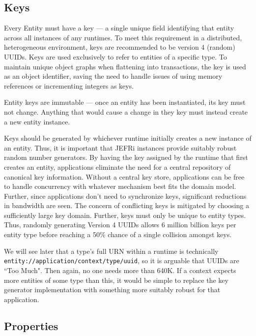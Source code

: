 \documentclass{article}
\newcommand{\ilcode}{\tt}
\begin{document}
\subsection{Keys}

Every Entity must have a key --- a single unique field identifying that entity
across all instances of any runtimes. To meet this requirement in a distributed,
heterogeneous environment, keys are recommended to be version 4 (random) UUIDs. Keys are used
exclusively to refer to entities of a specific type. To maintain unique object
graphs when flattening into transactions, the key is used as an object
identifier, saving the need to handle issues of using memory references or
incrementing integers as keys.

Entity keys are immutable --- once an entity has been instantiated, its key must
not change. Anything that would cause a change in they key must instead create
a new entity instance.

Keys should be generated by whichever runtime initially creates a new instance
of an entity. Thus, it is important that JEFRi instances provide suitably robust
random number generators. By having the key assigned by the runtime that first
creates an entity, applications eliminate the need for a central repository of
canonical key information. Without a central key store, applications can be
free to handle concurrency with whatever mechanism best fits the domain model.
Further, since applications don't need to synchronize keys, significant
reductions in bandwidth are seen. The concern of conflicting keys is mitigated
by choosing a sufficiently large key domain. Further, keys must only be unique
to entity types. Thus, randomly generating Version 4 UUIDs allows 6 million
billion keys per entity type before reaching a 50\% chance of a single collision
amongst keys.

We will see later that a type's full URN within a runtime is technically
{\ilcode entity://\-application/\-context/\-type/\-uuid}, so it is arguable that UUIDs are ``Too
Much". Then again, no one needs more than 640K. If a context expects more
entities of some type than this, it would be simple to replace the key generator
implementation with something more suitably robust for that application.

\subsection{Properties}
\end{document}
